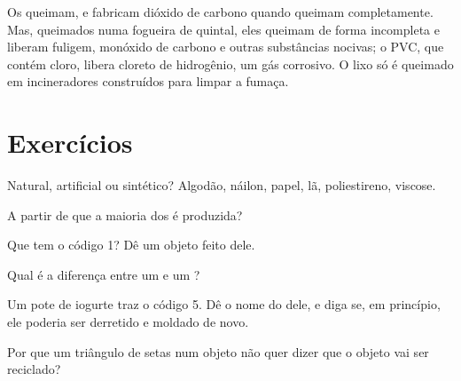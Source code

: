 \begin{remark}\label{rem:g8:plastics:burning}
Os  queimam, e fabricam dióxido de carbono quando queimam
completamente. Mas, queimados numa fogueira de quintal, eles queimam de
forma incompleta e liberam fuligem, monóxido de carbono e outras
substâncias nocivas; o PVC, que contém cloro, libera cloreto de
hidrogênio, um gás corrosivo. O lixo  só é queimado em
incineradores construídos para limpar a fumaça.
\end{remark}

\section{Exercícios}

\begin{exercise}[$\star$]\label{exo:g8:plastics:1}
Natural, artificial ou sintético? Algodão, náilon, papel, lã,
poliestireno, viscose.
\end{exercise}

\begin{exercise}[$\star$]\label{exo:g8:plastics:2}
A partir de que  a maioria dos  é produzida?
\end{exercise}

\begin{exercise}[$\star$]\label{exo:g8:plastics:3}
Que  tem o código 1? Dê um objeto feito dele.
\end{exercise}

\begin{exercise}[$\star$]\label{exo:g8:plastics:4}
Qual é a diferença entre um  e um ?
\end{exercise}

\begin{exercise}[$\star\star$]\label{exo:g8:plastics:5}
Um pote de iogurte traz o código 5. Dê o nome do  dele, e diga
se, em princípio, ele poderia ser derretido e moldado de novo.
\end{exercise}

\begin{exercise}[$\star\star$]\label{exo:g8:plastics:6}
Por que um triângulo de setas num objeto não quer dizer que o objeto vai
ser reciclado?
\end{exercise}

